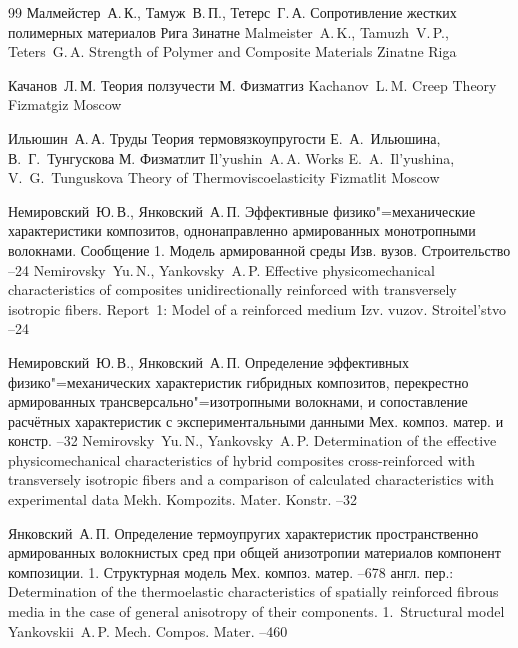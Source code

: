 \begin{thebibliography}{99}
\by Малмейстер~А.\,К., Тамуж~В.\,П., Тетерс~Г.\,А.
\book Сопротивление жестких полимерных материалов
\publaddr Рига
\publ Зинатне
\misctransl
\by Malmeister~A.\,K., Tamuzh~V.\,P.,  Teters~G.\,A.
\book Strength of Polymer and Composite Materials 
\publ Zinatne
\publaddr Riga

\by Качанов~Л.\,М.
\book Теория ползучести
\publaddr М.
\publ Физматгиз
\misctransl
\by Kachanov~L.\,M.
\book Creep Theory 
\publ Fizmatgiz
\publaddr Moscow 

\by Ильюшин~А.\,А.
\book Труды
\voltitle Теория термовязкоупругости
\eds Е.~А.~Ильюшина, В.~Г.~Тунгускова
\publaddr М.
\publ  Физматлит
\misctransl
\by Il'yushin~A.\,A.
\book Works
\eds E.~A.~Il'yushina, V.~G.~Tunguskova
\voltitle Theory of Thermoviscoelasticity 
\publ Fizmatlit
\publaddr Moscow 


\by Немировский~Ю.\,В., Янковский~А.\,П.
\paper Эффективные физико"=механические характеристики композитов, однонаправленно армированных монотропными волокнами.
 Сообщение 1. Модель армированной среды
\jour Изв. вузов. Строительство
--24
\misctransl
\by Nemirovsky~Yu.\,N., Yankovsky~A.\,P.
\paper Effective physicomechanical characteristics of composites unidirectionally reinforced with transversely isotropic fibers. Report~1: Model of a reinforced medium
\jour Izv. vuzov. Stroitel'stvo 
--24

\by Немировский~Ю.\,В., Янковский~А.\,П.
\paper Определение эффективных физико"=механических характеристик гибридных композитов, перекрестно армированных трансверсально"=изотропными волокнами, и сопоставление расчётных характеристик с экспериментальными данными
\jour Мех. композ. матер. и констр.
--32
\misctransl
\by Nemirovsky~Yu.\,N., Yankovsky~A.\,P.
\paper Determination of the effective physicomechanical characteristics of hybrid composites cross-reinforced with transversely isotropic fibers and a comparison of calculated characteristics with experimental data
\jour Mekh. Kompozits. Mater. Konstr.
--32


\by Янковский~А.\,П.
\paper Определение термоупругих характеристик пространственно армированных волокнистых сред при
общей анизотропии материалов компонент композиции. 1. Структурная модель
\jour Мех. композ. матер.
--678
\transl англ. пер.:~
\paper Determination of the thermoelastic characteristics of spatially reinforced fibrous media in the case of general anisotropy of their components. 1.~Structural model
\by Yankovskii~A.\,P.
\jour Mech. Compos. Mater.
--460




\end{thebibliography}
